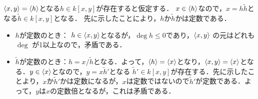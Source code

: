 \documentclass[9pt]{ltjsarticle}
\begin{document}
\begin{enumerate}[label=(問題\arabic*)]
$\left\langle x,y \right\rangle=\left\langle h \right\rangle$となる$h\in k[x,y]$が存在すると仮定する．
$x\in \left\langle h \right\rangle$なので，$x=h\tilde h$となる$\tilde h\in k[x,y]$となる．
先に示したことにより，$h$か$\tilde h$かは定数である．
\begin{itemize}
 \item $h$が定数のとき：
$h\in \left\langle x,y \right\rangle$となるが，$\deg h \le 0$であり，$\left\langle x,y \right\rangle$
の元はどれも$\deg$       が1以上なので，矛盾である．
 \item $\tilde h$が定数のとき：$h=x/\tilde h$となる．よって，$\left\langle h \right\rangle=\left\langle x \right\rangle$となり，$\left\langle x,y \right\rangle=\left\langle x \right\rangle$となる．$y\in \left\langle x \right\rangle$となので，$y=x\tilde h'$となる
$\tilde h' \in k[x,y]$が存在する．先に示したことより，$x$か$\tilde h'$かは定数になるが，$x$は定数ではないので$\tilde h'$が定数である．よって，$y$は$x$の定数倍となるが，これは矛盾である．
\end{itemize}


\end{enumerate}
\end{document}
